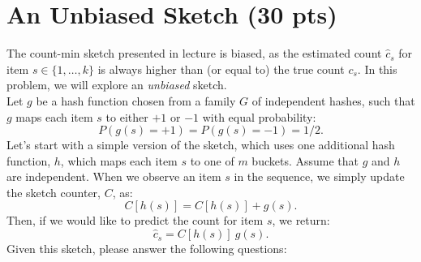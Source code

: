 \documentclass{exam}
\newcommand{\grade}[1]{\small\textcolor{magenta}{\emph{[#1 points]}} \normalsize}
\begin{document}
\begin{enumerate}[label=(\alph*)]


\end{enumerate}





\newpage
\section{An Unbiased Sketch (30 pts)}
  The count-min sketch presented in lecture is {biased}, as the estimated count $\hat{c}_s$ for item $s \in \{1,\ldots,k\}$ is always
  higher than (or equal to) the true count $c_s$. In this problem,
  we will explore an \textit{unbiased} sketch.  \\

\noindent Let
  $g$ be a hash function chosen from a family $G$ of independent
  hashes, such that $g$ maps each item $s$ to either $+1$ or $-1$ with
  equal probability:
 \[
 P(g(s) = +1) = P(g(s) = -1) = 1/2. 
 \]
 Let's start with a simple version of the sketch, which uses one additional hash function, $h$, which maps each item $s$ to one of $m$ buckets. 
Assume that $g$ and $h$ are independent. When we observe an item $s$ in the
sequence, we simply update the sketch counter, $C$, as:
\[
C[h(s)] =C[h(s)] + g(s).
\]
Then, if we would like to predict the count for item $s$,
we return:
\[
\hat{c}_s = C[h(s)] \  g(s).
\]
Given this sketch, please answer the following questions:
\end{document}
